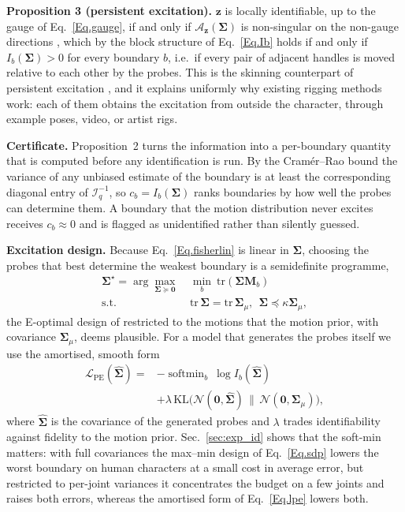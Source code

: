 \documentclass[lettersize,journal]{IEEEtran}
\newenvironment{revblock}{\par\color{red}}{\par}
\begin{document}
\begin{revblock}
\textbf{Proposition 3 (persistent excitation).} $\bm{z}$ is locally identifiable, up to the gauge
of Eq.~\ref{Eq.gauge}, if and only if $\mathcal{A}_{\bm{z}}(\bm{\Sigma})$ is non-singular on the
non-gauge directions \cite{rothenberg1971identification}, which by the block structure of
Eq.~\ref{Eq.Ib} holds if and only if $I_{b}(\bm{\Sigma})>0$ for every boundary $b$, i.e.\ if every
pair of adjacent handles is moved relative to each other by the probes. This is the
skinning counterpart of persistent excitation \cite{ljung1999system}, and it explains
uniformly why existing rigging methods work: each of them obtains the excitation from outside
the character, through example poses, video, or artist rigs.

\textbf{Certificate.} Proposition~2 turns the information into a per-boundary quantity that is
computed before any identification is run. By the Cram\'er--Rao bound the variance of any
unbiased estimate of the boundary is at least the corresponding diagonal entry of
$\mathcal{I}_{q}^{-1}$, so $c_{b}=I_{b}(\bm{\Sigma})$ ranks boundaries by how well the probes
can determine them. A boundary that the motion distribution never excites receives
$c_{b}\approx0$ and is flagged as unidentified rather than silently guessed.

\textbf{Excitation design.} Because Eq.~\ref{Eq.fisherlin} is linear in $\bm{\Sigma}$, choosing
the probes that best determine the weakest boundary is a semidefinite programme,
\begin{equation} \label{Eq.sdp}
\begin{aligned}
\bm{\Sigma}^{\star}=\arg\max_{\bm{\Sigma}\succeq\bm{0}}\ &\min_{b}\ \mathrm{tr}(\bm{\Sigma}\bm{M}_{b})\\
\text{s.t.}\ \ &\mathrm{tr}\,\bm{\Sigma}=\mathrm{tr}\,\bm{\Sigma}_{\mu},\ \
\bm{\Sigma}\preceq\kappa\bm{\Sigma}_{\mu},
\end{aligned}
\end{equation}
the E-optimal design of \cite{kiefer1960equivalence} restricted to the motions that the
motion prior, with covariance $\bm{\Sigma}_{\mu}$, deems plausible. For a model that generates the
probes itself we use the amortised, smooth form
\begin{equation} \label{Eq.lpe}
\begin{aligned}
\mathcal{L}_{\text{PE}}(\hat{\bm{\Sigma}})={}&-\operatorname{softmin}_{b}\ \log I_{b}(\hat{\bm{\Sigma}})\\
&+\lambda\,\mathrm{KL}\big(\mathcal{N}(\bm{0},\hat{\bm{\Sigma}})\,\big\|\,\mathcal{N}(\bm{0},\bm{\Sigma}_{\mu})\big),
\end{aligned}
\end{equation}
where $\hat{\bm{\Sigma}}$ is the covariance of the generated probes and $\lambda$ trades
identifiability against fidelity to the motion prior. Sec.~\ref{sec:exp_id} shows that the
soft-min matters: with full covariances the max--min design of Eq.~\ref{Eq.sdp} lowers the worst
boundary on human characters at a small cost in average error, but restricted to per-joint
variances it concentrates the budget on a few joints and raises both errors, whereas the
amortised form of Eq.~\ref{Eq.lpe} lowers both.
\end{revblock}
\end{document}

